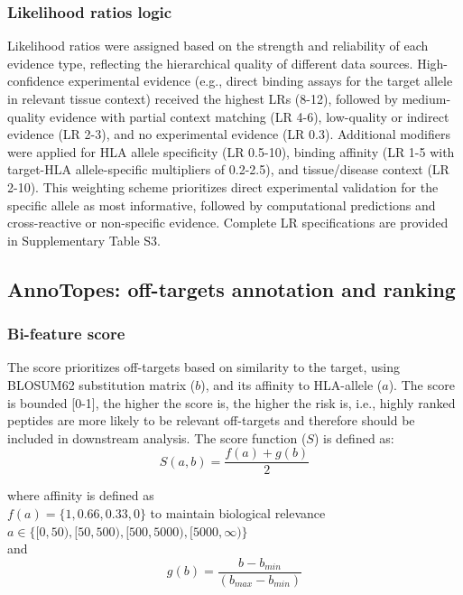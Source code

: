 \documentclass[unnumsec,webpdf,contemporary,large]{oup-authoring-template}%
\theoremstyle{thmstyleone}%
\theoremstyle{thmstyletwo}%
\theoremstyle{thmstylethree}%
\begin{document}
        \subsubsection{Likelihood ratios logic}
            Likelihood ratios were assigned based on the strength and reliability of each evidence type, reflecting the hierarchical quality of different data sources. High-confidence experimental evidence (e.g., direct binding assays for the target allele in relevant tissue context) received the highest LRs (8-12), followed by medium-quality evidence with partial context matching (LR 4-6), low-quality or indirect evidence (LR 2-3), and no experimental evidence (LR 0.3). Additional modifiers were applied for HLA allele specificity (LR 0.5-10), binding affinity (LR 1-5 with target-HLA allele-specific multipliers of 0.2-2.5), and tissue/disease context (LR 2-10). This weighting scheme prioritizes direct experimental validation for the specific allele as most informative, followed by computational predictions and cross-reactive or non-specific evidence. Complete LR specifications are provided in Supplementary Table S3.

    \subsection{AnnoTopes: off-targets annotation and ranking}\label{annotopes}
        \subsubsection{\textbf{Bi-feature score}}\label{annotopes_bi}
        The score prioritizes off-targets based on similarity to the target, using BLOSUM62 substitution matrix ($b$), and its affinity to HLA-allele ($a$). The score is bounded [0-1], the higher the score is, the higher the risk is, i.e., highly ranked peptides are more likely to be relevant off-targets and therefore should be included in downstream analysis. 
        The score function ($S$) is defined as:
        \begin{equation}
            S(a,b)=  \frac{f(a)+g(b)}{2}
        \end{equation}

        where affinity is defined as \\
        $f(a)= \{1,0.66,0.33,0\}$ to maintain biological relevance  \\
        $a \in \{[0,50),[50,500),[500,5000),[5000,\infty)\}$ \\
        and
        \begin{equation}
            g(b)=  \frac{b- b_{min}}{(b_{max}-b_{min})} 
        \end{equation}
\end{document}
